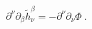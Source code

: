 \begin{equation}
\partial ^{\nu }\partial _{\beta }\tilde{h}_{\nu }^{\beta }=-\partial ^{\nu
}\partial _{\nu }\Phi \ .  \label{pp}
\end{equation}%
